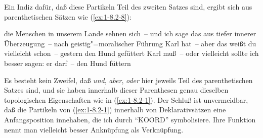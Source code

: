 \documentclass[output=paper]{langsci/langscibook}
\begin{document}
Ein Indiz dafür, daß diese Partikeln Teil des zweiten Satzes sind, ergibt sich aus
parenthetischen Sätzen wie (\ref{ex:1-8.2-8}):
\begin{exe}
\ex\label{ex:1-8.2-8}
\begin{xlist}
\ex\label{ex:1-8.2-8a}  die Menschen in unserem Lande sehnen sich~-- und ich sage das aus tiefer innerer Überzeugung~-- nach geistig"=moralischer Führung
\ex\label{ex:1-8.2-8b} Karl hat~-- aber das weißt du vielleicht schon~-- gestern den Hund gefüttert
\ex\label{ex:1-8.2-8c} Karl muß~– oder vielleicht sollte ich besser sagen: er darf~-- den Hund
füttern
\end{xlist}
\end{exe}
\addlines[-1]
Es besteht kein Zweifel, daß \textit{und}, \textit{aber}, \textit{oder} hier jeweils Teil des parenthetischen Satzes sind, und sie haben innerhalb dieser Parenthesen genau dieselben topologischen Eigenschaften wie in (\ref{ex:1-8.2-1}). Der Schluß ist unvermeidbar, daß die Partikeln
von (\ref{ex:1-8.2-1}) innerhalb von Deklarativsätzen eine Anfangsposition innehaben, die ich
durch "`KOORD"' symbolisiere. Ihre Funktion nennt man vielleicht besser Anknüpfung als Verknüpfung.
\end{document}
